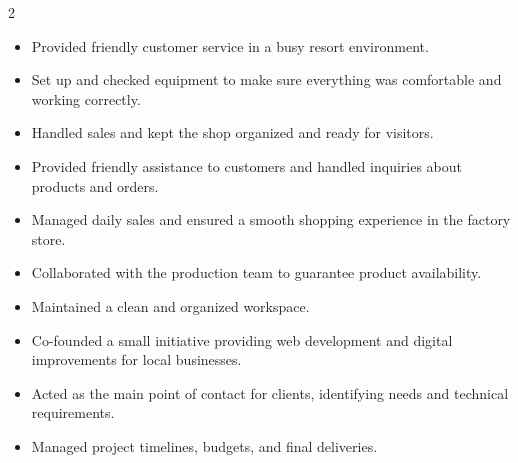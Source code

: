 \documentclass[10pt,a4paper,withhyper]{altacv}
\begin{document}



\makecvheader


\begin{paracol}{2}

\begin{itemize}
\item Provided friendly customer service in a busy resort environment.
\item Set up and checked equipment to make sure everything was comfortable and working correctly.
\item Handled sales and kept the shop organized and ready for visitors.
\end{itemize}

\divider

\begin{itemize}
\item Provided friendly assistance to customers and handled inquiries about products and orders.
\item Managed daily sales and ensured a smooth shopping experience in the factory store.
\item Collaborated with the production team to guarantee product availability.
\item Maintained a clean and organized workspace.
\end{itemize}


\begin{itemize}
\item Co-founded a small initiative providing web development and digital improvements for local businesses.
\item Acted as the main point of contact for clients, identifying needs and technical requirements.
\item Managed project timelines, budgets, and final deliveries.
\end{itemize}


\end{paracol}
\end{document}
